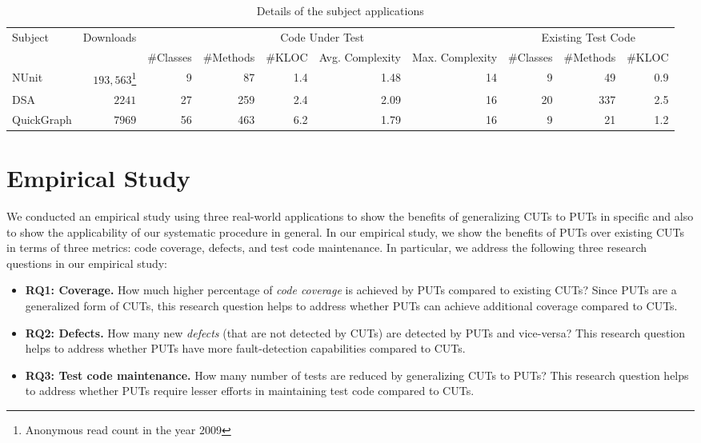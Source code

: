 \begin{table*}[t]%
\centering
\begin{minipage}{\textwidth}
\centering
\begin{tabular}{|l|r|r|r|r|r|r|r|r|r|}
\hline
Subject 		& Downloads 	& \multicolumn{5}{|c|}{Code Under Test} 															&	\multicolumn{3}{|c|}{Existing Test Code} 	\\ \cline{3-10}
						& 						&	\#Classes	&	\#Methods	& \#KLOC	& Avg. Complexity & Max. Complexity	&	\#Classes	&	\#Methods &	\#KLOC						\\ \hline\hline
NUnit				&		$193,563$\footnote{Anonymous read count in the year 2009}
													&	9					&	87  			&		1.4		&				1.48 			& 14 							&			9			&			49		&		0.9							\\ \hline
DSA					&		$2241$		&	27  			&	259 			&		2.4		&				2.09 			& 16							&			20		&			337		&		2.5							\\ \hline		
QuickGraph	&		$7969$ 		&	56				&	463				&		6.2		&				1.79			& 16							&			9			&			21		&		1.2							\\ \hline
\end{tabular}
\end{minipage} \vspace*{-3ex}
\caption{Details of the subject applications} \vspace*{-3ex}
\label{tab:subjectmetrics}
\end{table*} 

\section{Empirical Study}
\label{sec:study}

We conducted an empirical study using three real-world applications to show the benefits of generalizing CUTs to PUTs in specific and also to show the applicability of our systematic procedure in general. In our empirical study, we show the benefits of PUTs over existing CUTs in terms of three metrics: code coverage, defects, and test code maintenance. In particular, we address the following three research questions in our empirical study:

\begin{itemize}
	\item \textbf{RQ1: Coverage.} How much higher percentage of \emph{code coverage} is achieved by PUTs compared to existing CUTs? Since PUTs are a generalized form of CUTs, this research question helps to address whether PUTs can achieve additional coverage compared to CUTs.
	\item \textbf{RQ2: Defects.} How many new \emph{defects} (that are not detected by CUTs) are detected by PUTs and vice-versa? This research question helps to address whether PUTs have more fault-detection capabilities compared to CUTs.
	\item \textbf{RQ3: Test code maintenance.} How many number of tests are reduced by generalizing CUTs to PUTs? This research question helps to address whether PUTs require lesser efforts in maintaining test code compared to CUTs.
\end{itemize}

